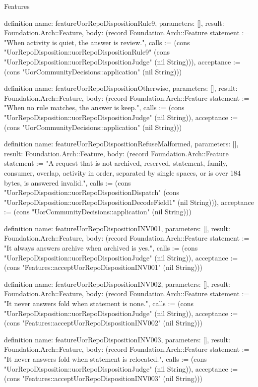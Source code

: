 \begin{lexlean}{Features}
\begin{semanticmodule}
definition{
  name: featureUorRepoDispositionRule9,
  parameters: [],
  result: Foundation.Arch::Feature,
  body: (record Foundation.Arch::Feature {statement := "When activity is quiet, the answer is review.", calls := (cons "UorRepoDisposition::uorRepoDispositionRule9" (cons "UorRepoDisposition::uorRepoDispositionJudge" (nil String))), acceptance := (cons "UorCommunityDecisions::application" (nil String))})
}

definition{
  name: featureUorRepoDispositionOtherwise,
  parameters: [],
  result: Foundation.Arch::Feature,
  body: (record Foundation.Arch::Feature {statement := "When no rule matches, the answer is keep.", calls := (cons "UorRepoDisposition::uorRepoDispositionJudge" (nil String)), acceptance := (cons "UorCommunityDecisions::application" (nil String))})
}

definition{
  name: featureUorRepoDispositionRefuseMalformed,
  parameters: [],
  result: Foundation.Arch::Feature,
  body: (record Foundation.Arch::Feature {statement := "A request that is not archived, reserved, statement, family, consumer, overlap, activity in order, separated by single spaces, or is over 184 bytes, is answered invalid.", calls := (cons "UorRepoDisposition::uorRepoDispositionDispatch" (cons "UorRepoDisposition::uorRepoDispositionDecodeField1" (nil String))), acceptance := (cons "UorCommunityDecisions::application" (nil String))})
}

definition{
  name: featureUorRepoDispositionINV001,
  parameters: [],
  result: Foundation.Arch::Feature,
  body: (record Foundation.Arch::Feature {statement := "It always answers archive when archived is yes.", calls := (cons "UorRepoDisposition::uorRepoDispositionJudge" (nil String)), acceptance := (cons "Features::acceptUorRepoDispositionINV001" (nil String))})
}

definition{
  name: featureUorRepoDispositionINV002,
  parameters: [],
  result: Foundation.Arch::Feature,
  body: (record Foundation.Arch::Feature {statement := "It never answers fold when statement is none.", calls := (cons "UorRepoDisposition::uorRepoDispositionJudge" (nil String)), acceptance := (cons "Features::acceptUorRepoDispositionINV002" (nil String))})
}

definition{
  name: featureUorRepoDispositionINV003,
  parameters: [],
  result: Foundation.Arch::Feature,
  body: (record Foundation.Arch::Feature {statement := "It never answers fold when statement is relocated.", calls := (cons "UorRepoDisposition::uorRepoDispositionJudge" (nil String)), acceptance := (cons "Features::acceptUorRepoDispositionINV003" (nil String))})
}


\end{semanticmodule}
\end{lexlean}
